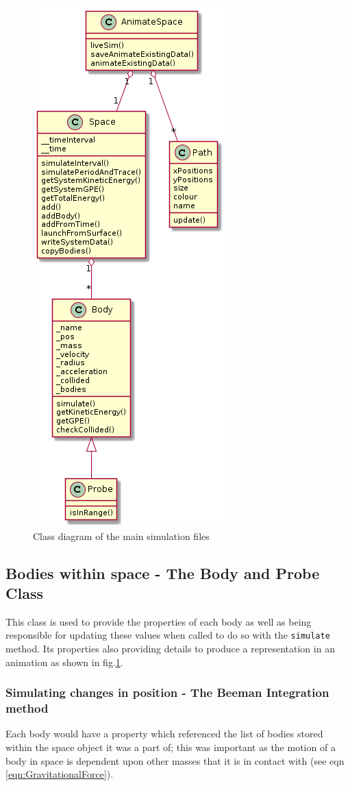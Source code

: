 \documentclass{article}
\begin{document}
        
        \begin{figure}[!ht]
            \centering
            \includegraphics[width = 0.3\linewidth]{Figures/classDiagram.png}
            \caption{Class diagram of the main simulation files}
            \label{fig:classDiagram}
        \end{figure}

        \pagebreak
        \subsection{Bodies within space - The Body and Probe Class}
            This class is used to provide the properties of each body as well as being 
            responsible for updating these values when called to do so with the \verb|simulate| method. 
            Its properties also providing details to produce a representation in an animation as 
            shown in fig.\ref{fig:classDiagram}.
            
            \subsubsection{Simulating changes in position - The Beeman Integration method}\label{S:Accel}

                Each body would have a property which referenced the list of bodies stored 
                within the space object it was a part of; this was important as the motion of a body
                in space is dependent upon other masses that it is in contact with (see eqn 
                \ref{eqn:GravitationalForce}).
\end{document}
